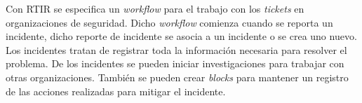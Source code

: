 {
	Con RTIR se especifica un \textit{workflow} para el trabajo con los \textit{tickets} en organizaciones de seguridad.
	Dicho \textit{workflow} comienza cuando se reporta un incidente, dicho reporte de incidente se asocia a un incidente o
	se crea uno nuevo. Los incidentes tratan de registrar toda la información necesaria para resolver el problema. De los
	incidentes se pueden iniciar investigaciones para trabajar con otras organizaciones. También se pueden crear
	\textit{blocks} para mantener un registro de las acciones realizadas para mitigar el incidente.}

% 
%
